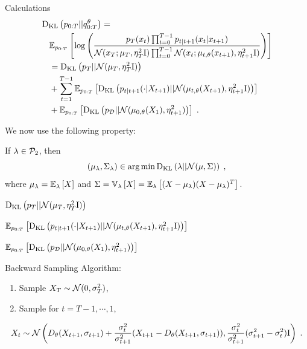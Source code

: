 \documentclass[10pt]{beamer}
\begin{document}
\begin{frame}{Calculations}
  \begin{align*}
    &\operatorname{D}_{\operatorname{KL}}\left(p_{0:T}||q_{0:T}^{\theta}\right) = \\
    &\quad \mathbb{E}_{p_{0:T}}\left[\log\left(\frac{p_T(x_t) \prod_{t=0}^{T-1} p_{t|t+1}(x_{t} | x_{t+1})}{\mathcal{N}(x_T; \mu_{T}, \eta_T^2 \mathrm{I}) \prod_{t=0}^{T-1} \mathcal{N}(x_{t}; \mu_{t, \theta}(x_{t+1}), \eta_{t+1}^2 \mathrm{I})}\right)\right] \\
    &\quad =\operatorname{D}_{\operatorname{KL}}\left(p_T||\mathcal{N}(\mu_{T}, \eta_T^2 \mathrm{I})\right) \\
    &\quad + \sum_{t=1}^{T-1} \mathbb{E}_{p_{0:T}}\left[\operatorname{D}_{\operatorname{KL}}\left(p_{t|t+1}(\cdot | X_{t+1})||\mathcal{N}(\mu_{t, \theta}(X_{t+1}), \eta_{t+1}^2 \mathrm{I})\right)\right] \\
    &\quad + \mathbb{E}_{p_{0:T}}\left[\operatorname{D}_{\operatorname{KL}}\left(p_{\mathcal{D}}||\mathcal{N}(\mu_{0, \theta}(X_{1}), \eta_{t+1}^2)\right)\right] \;.
  \end{align*}

  \pause
  We now use the following property:
  \begin{lemma}
      If $\lambda \in \mathcal{P}_{2}$, then 
      $$ (\mu_\lambda, \Sigma_\lambda) \in \arg\min \operatorname{D}_{\operatorname{KL}}\left(\lambda||\mathcal{N}(\mu, \Sigma)\right) \;,$$
      where $\mu_\lambda = \mathbb{E}_{\lambda}\left[X\right]$ and $\Sigma = \mathbb{V}_{\lambda}\left[X\right] = \mathbb{E}_{\lambda}\left[(X - \mu_{\lambda})(X - \mu_{\lambda})^T\right]$.
  \end{lemma}
\end{frame}
\begin{frame}{$\operatorname{D}_{\operatorname{KL}}\left(p_T||\mathcal{N}(\mu_{T}, \eta_T^2 \mathrm{I})\right)$}
  
\end{frame}
\begin{frame}{$ \mathbb{E}_{p_{0:T}}\left[\operatorname{D}_{\operatorname{KL}}\left(p_{t|t+1}(\cdot | X_{t+1})||\mathcal{N}(\mu_{t, \theta}(X_{t+1}), \eta_{t+1}^2 \mathrm{I})\right)\right] $}

\end{frame}
\begin{frame}{$ \mathbb{E}_{p_{0:T}}\left[\operatorname{D}_{\operatorname{KL}}\left(p_{\mathcal{D}}||\mathcal{N}(\mu_{0, \theta}(X_{1}), \eta_{t+1}^2)\right)\right]$}
  
\end{frame}
\begin{frame}{Backward Sampling}
    Algorithm:
    \begin{enumerate}
      \item Sample $X_T \sim \mathcal{N}(0, \sigma_T^2)$,
      \item Sample for $t = T-1, \cdots, 1$,
    \end{enumerate}
    $$X_{t} \sim \mathcal{N}\left(D_{\theta}(X_{t+1}, \sigma_{t+1}) + \frac{\sigma_t^2}{\sigma_{t+1}^2}(X_{t+1} - D_{\theta}(X_{t+1}, \sigma_{t+1})),  \frac{\sigma_t^2}{\sigma_{t+1}^2}(\sigma_{t+1}^2 - \sigma_{t}^2)\mathrm{I}\right) \;.$$
\end{frame}
\end{document}

